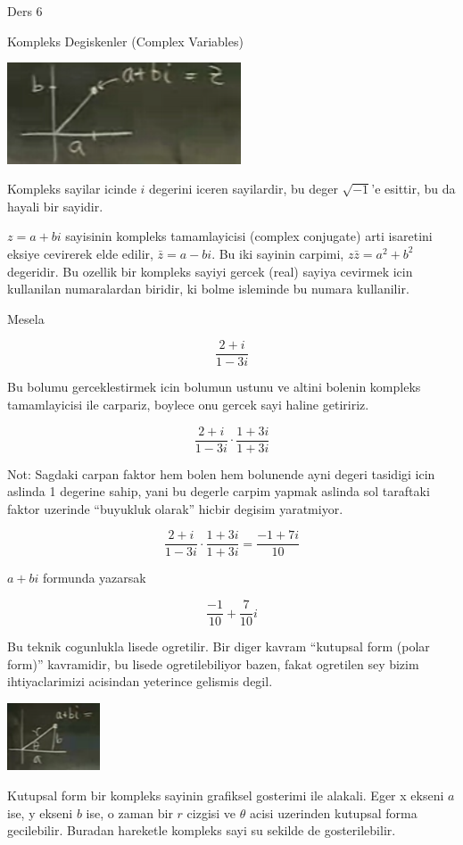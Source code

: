 \documentclass[12pt,fleqn]{article}
\begin{document}
Ders 6

Kompleks Degiskenler (Complex Variables)

\includegraphics[height=3cm]{6_1.png}

Kompleks sayilar icinde $i$ degerini iceren sayilardir, bu deger
$\sqrt{-1}$'e esittir, bu da hayali bir sayidir. 

$z=a+bi$ sayisinin kompleks tamamlayicisi (complex conjugate) arti
isaretini eksiye cevirerek elde edilir, $\bar{z}=a-bi$. Bu iki sayinin
carpimi, $z\bar{z} = a^2+b^2$ degeridir. Bu ozellik bir kompleks sayiyi
gercek (real) sayiya cevirmek icin kullanilan numaralardan biridir, ki
bolme isleminde bu numara kullanilir.

Mesela

\[ \frac{2+i}{1-3i} \]

Bu bolumu gerceklestirmek icin bolumun ustunu ve altini bolenin kompleks
tamamlayicisi ile carpariz, boylece onu gercek sayi haline getiririz.

\[ \frac{2+i}{1-3i} \cdot \frac{1+3i}{1+3i}\]

Not: Sagdaki carpan faktor hem bolen hem bolunende ayni degeri tasidigi
icin aslinda 1 degerine sahip, yani bu degerle carpim yapmak aslinda sol
taraftaki faktor uzerinde ``buyukluk olarak'' hicbir degisim yaratmiyor.

\[ \frac{2+i}{1-3i} \cdot \frac{1+3i}{1+3i} = \frac{-1+7i}{10}\]


$a+bi$ formunda yazarsak

\[ \frac{-1}{10} + \frac{7}{10}i \]

Bu teknik cogunlukla lisede ogretilir. Bir diger kavram ``kutupsal form
(polar form)'' kavramidir, bu lisede ogretilebiliyor bazen, fakat ogretilen
sey bizim ihtiyaclarimizi acisindan yeterince gelismis degil. 

\includegraphics[height=2cm]{6_2.png}

Kutupsal form bir kompleks sayinin grafiksel gosterimi ile alakali. Eger x
ekseni $a$ ise, y ekseni $b$ ise, o zaman bir $r$ cizgisi ve $\theta$ acisi
uzerinden kutupsal forma gecilebilir. Buradan hareketle kompleks sayi su
sekilde de gosterilebilir. 
\end{document}
